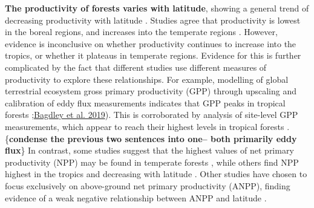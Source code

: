 \documentclass[]{article}
\begin{document}
\textbf{The productivity of forests varies with latitude}, showing a
general trend of decreasing productivity with latitude
\citep{beer_terrestrial_2010, jung_global_2011}. Studies agree that
productivity is lowest in the boreal regions, and increases into the
temperate regions
\citep{luyssaert_co_2007, huston_global_2009, beer_terrestrial_2010, jung_global_2011}.
However, evidence is inconclusive on whether productivity continues to
increase into the tropics, or whether it plateaus in temperate regions.
Evidence for this is further complicated by the fact that different
studies use different measures of productivity to explore these
relationships. For example, modelling of global terrestrial ecosystem
gross primary productivity (GPP) through upscaling and calibration of
eddy flux measurements indicates that GPP peaks in tropical forests
\citep{beer_terrestrial_2010, jung_global_2011};\href{https://onlinelibrary.wiley.com/doi/epdf/10.1111/gcb.14729}{Bagdley
et al. 2019}). This is corroborated by analysis of site-level GPP
measurements, which appear to reach their highest levels in tropical
forests \citep{luyssaert_co_2007}. \{\textbf{condense the previous two
sentences into one-- both primarily eddy flux}\} In contrast, some
studies suggest that the highest values of net primary productivity
(NPP) may be found in temperate forests
\citep{luyssaert_co_2007, huston_global_2009}, while others find NPP
highest in the tropics and decreasing with latitude
\citep{simova_enigma_2017}. Other studies have chosen to focus
exclusively on above-ground net primary productivity (ANPP), finding
evidence of a weak negative relationship between ANPP and latitude
\citep{huston_global_2009, gillman_latitude_2015}.
\end{document}
